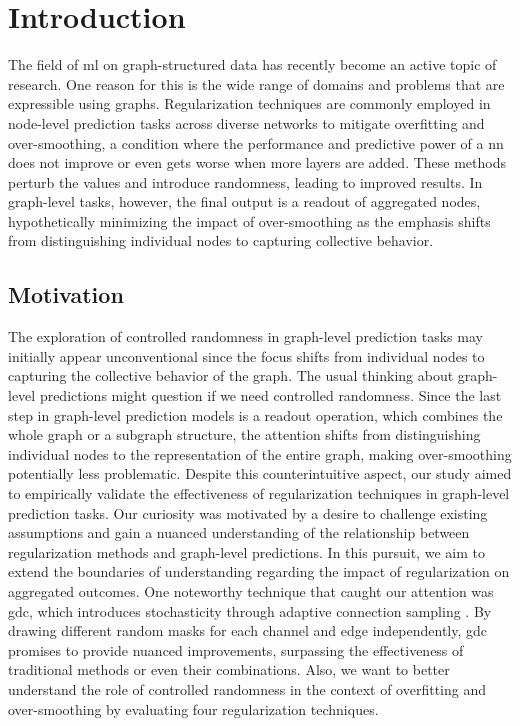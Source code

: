 \chapter{Introduction}%
\label{sec:intro}

\setcounter{page}{1}			%

The field of \acs{ml} on graph-structured data has recently become an active topic of research.
One reason for this is the wide range of domains and problems that are expressible using graphs.
Regularization techniques are commonly employed in node-level prediction tasks across diverse networks to mitigate overfitting and over-smoothing, a condition where the performance and predictive power of a \ac{nn} does not improve or even gets worse when more layers are added. %
These methods perturb the values and introduce randomness, leading to improved results.
In graph-level tasks, however, the final output is a readout of aggregated nodes, hypothetically minimizing the impact of over-smoothing as the emphasis shifts from distinguishing individual nodes to capturing collective behavior.


\section{Motivation}%
\label{sec:intro:motivation}

The exploration of controlled randomness in graph-level prediction tasks may initially appear unconventional since the focus shifts from individual nodes to capturing the collective behavior of the graph.
The usual thinking about graph-level predictions might question if we need controlled randomness.
Since the last step in graph-level prediction models is a readout operation, which combines the whole graph or a subgraph structure,
the attention shifts from distinguishing individual nodes to the representation of the entire graph, making over-smoothing potentially less problematic.
Despite this counterintuitive aspect, our study aimed to empirically validate the effectiveness of regularization techniques in graph-level prediction tasks.
Our curiosity was motivated by a desire to challenge existing assumptions and gain a nuanced understanding of the relationship between regularization methods and graph-level predictions.
In this pursuit, we aim to extend the boundaries of understanding regarding the impact of regularization on aggregated outcomes.
One noteworthy technique that caught our attention was \acf{gdc}, which introduces stochasticity through adaptive connection sampling \cite{Hasanzadeh2020}.
By drawing different random masks for each channel and edge independently, \ac{gdc} promises to provide nuanced improvements, surpassing the effectiveness of traditional methods or even their combinations.
Also, we want to better understand the role of controlled randomness in the context of overfitting and over-smoothing by evaluating four regularization techniques.

